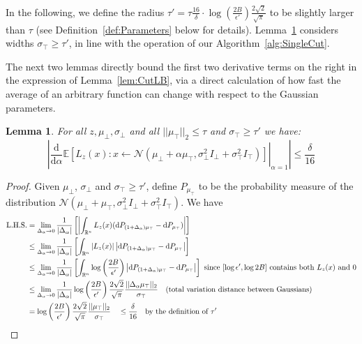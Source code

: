 \documentclass[11pt,letter]{article}
\newcommand{\Exp}{\mathbb{E}}
\newcommand{\from}{\leftarrow}
\newcommand{\Normal}{\mathcal{N}}
\newcommand{\Real}{\mathbb{R}}
\renewcommand{\d}{\mathrm{d}}
\newcommand{\Diff}[2][]{\frac{\d#1}{\d#2}}
\newcommand{\perr}{\delta}
\newcounter{nTheorems}
\numberwithin{nTheorems}{section}
\newtheorem{lemma}[nTheorems]{Lemma}
\begin{document}
In the following, we define the radius $\tau'=\tau\frac{16}{\perr}\cdot\log\left(\frac{2B}{\epsilon'}\right)\frac{2\sqrt{2}}{\sqrt{\pi}}$ to be slightly larger than $\tau$ (see Definition~\ref{def:Parameters} below for details).
Lemma~\ref{lem:MovingInThinDimension} considers widths $\sigma_\top\geq\tau'$, in line with the operation of our Algorithm~\ref{alg:SingleCut}.

The next two lemmas directly bound the first two derivative terms on the right in the expression of Lemma~\ref{lem:CutLB}, via a direct calculation of how fast the average of an arbitrary function can change with respect to the Gaussian parameters.

\begin{lemma}
\label{lem:MovingInThinDimension}
For all $z, \mu_\bot, \sigma_\bot$ and all $||\mu_\top||_2\leq\tau$ and $\sigma_\top\geq\tau'$ we have:
$$ \left|\left.\Diff{\alpha} \Exp\left[L_z(x) : x \from \Normal(\mu_\bot +\alpha \mu_\top, \sigma_\bot^2 I_\bot + \sigma_\top^2 I_\top) \right]\right|_{\alpha = 1}\right| \le \frac{\perr}{16}
$$
\end{lemma}

\begin{proof}
Given $\mu_\bot$, $\sigma_\bot$ and $\sigma_\top \ge \tau'$, define $P_{\mu_\top}$ to be the probability measure of the distribution $\Normal(\mu_\bot + \mu_\top, \sigma_\bot^2 I_\bot + \sigma_\top^2 I_\top)$. We have
\begin{align*}
\text{L.H.S.} &= \lim_{\Delta_\alpha \to 0} \frac{1}{|\Delta_\alpha|} \left[\left|\int_{\Real^n} L_z(x) (\d P_{(1+\Delta_\alpha)\mu_\top} - \d P_{\mu_\top})\right|\right]\\
&\le\lim_{\Delta_\alpha \to 0} \frac{1}{|\Delta_\alpha|} \left[\int_{\Real^n} \left|L_z(x)\right| \left|\d P_{(1+\Delta_\alpha)\mu_\top} - \d P_{\mu_\top}\right|\right]\\
&\le\lim_{\Delta_\alpha \to 0} \frac{1}{|\Delta_\alpha|} \left[\int_{\Real^n} \log\left(\frac{2B}{\epsilon'}\right) \left|\d P_{(1+\Delta_\alpha)\mu_\top} - \d P_{\mu_\top}\right|\right] \text{ since $[\log\epsilon',\log 2B]$ contains both $L_z(x)$ and 0}\\
&\le\lim_{\Delta_\alpha \to 0} \frac{1}{|\Delta_\alpha|} \log\left(\frac{2B}{\epsilon'}\right) \frac{2\sqrt{2}}{\sqrt{\pi}}\frac{||\Delta_\alpha\mu_\top||_2}{\sigma_\top} \text{\quad (total variation distance between Gaussians)}\\
&= \log\left(\frac{2B}{\epsilon'}\right)\frac{2\sqrt{2}}{\sqrt{\pi}}\frac{||\mu_\top||_2}{\sigma_\top} \quad\le \frac{\perr}{16} \text{\quad by the definition of $\tau'$}
\end{align*}
\end{proof}
\end{document}
